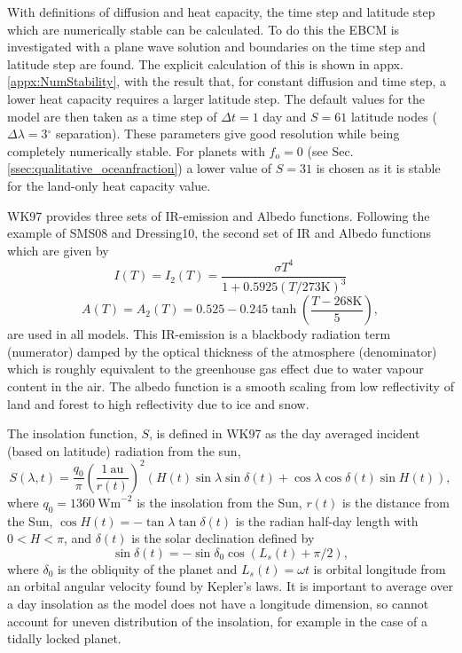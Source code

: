 \documentclass[12pt, onecolumn]{revtex4-2}    %
\newcommand{\degrees}{\ensuremath{^{\circ}}}
\begin{document}
With definitions of diffusion and heat capacity, the time step and latitude step which are numerically stable can be calculated.
To do this the EBCM is investigated with a plane wave solution and boundaries on the time step and latitude step are found.
The explicit calculation of this is shown in appx. \ref{appx:NumStability}, with the result that, for constant diffusion and time step, a lower heat capacity requires a larger latitude step.
The default values for the model are then taken as a time step of $\Delta t = 1$ day and $S = 61$ latitude nodes ($\Delta \lambda = 3\degrees$ separation).
These parameters give good resolution while being completely numerically stable.
For planets with $f_\text{o} = 0$ (see Sec. \ref{ssec:qualitative_oceanfraction}) a lower value of $S=31$ is chosen as it is stable for the land-only heat capacity value.

WK97 provides three sets of IR-emission and Albedo functions. Following the example of SMS08 and Dressing10, the second set of IR and Albedo functions which are given by
\begin{equation}
  I(T) = I_2(T) = \frac{\sigma T^4}{1 + 0.5925 (T / 273 \text{K}) ^ 3}
\end{equation}
\begin{equation}
  A(T) = A_2(T) = 0.525 - 0.245 \tanh\left(\frac{T - 268 \text{K}}{5}\right),
\end{equation}
are used in all models.
This IR-emission is a blackbody radiation term (numerator) damped by the optical thickness of the atmosphere (denominator) which is roughly equivalent to the greenhouse gas effect due to water vapour content in the air.
The albedo function is a smooth scaling from low reflectivity of land and forest to high reflectivity due to ice and snow.

The insolation function, $S$, is defined in WK97 as the day averaged incident (based on latitude) radiation from the sun,
\begin{equation}
  S(\lambda, t) = \frac{q_0}{\pi} \left(\frac{1 \ \text{au}}{r(t)}\right)^2 (H(t) \sin{\lambda} \sin{\delta(t)} + \cos{\lambda} \cos{\delta(t)} \sin{H(t)}),
  \label{eq:diurnally_averaged_insolation}
\end{equation}
where $q_0=1360 \ \text{Wm}^{-2}$ is the insolation from the Sun,
$r(t)$ is the distance from the Sun,
$\cos H(t) = -\tan \lambda \tan \delta(t)$ is the radian half-day length with $0 < H < \pi$,
and $\delta(t)$ is the solar declination defined by
\begin{equation}
  \sin \delta(t) = -\sin \delta_0 \cos(L_s(t) + \pi/2),
  \label{eq:solar_declination}
\end{equation}
where $\delta_0$ is the obliquity of the planet and $L_s(t) = \omega t$ is orbital longitude from an orbital angular velocity found by Kepler's laws.
It is important to average over a day insolation as the model does not have a longitude dimension, so cannot account for uneven distribution of the insolation, for example in the case of a tidally locked planet.
\end{document}
